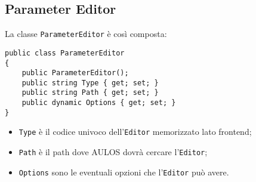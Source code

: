 \subsection{Parameter Editor}
La classe \verb|ParameterEditor| è così composta:
\begin{lstlisting}[caption={ParameterEditor.cs},style=sharpCode]
public class ParameterEditor
{
    public ParameterEditor();
    public string Type { get; set; }
    public string Path { get; set; }
    public dynamic Options { get; set; }
}
\end{lstlisting}
\begin{itemize}
\item \verb|Type| è il codice univoco dell'\verb|Editor| memorizzato lato frontend;
\item \verb|Path| è il path dove AULOS dovrà cercare l'\verb|Editor|;
\item \verb|Options| sono le eventuali opzioni che l'\verb|Editor| può avere.
\end{itemize}

